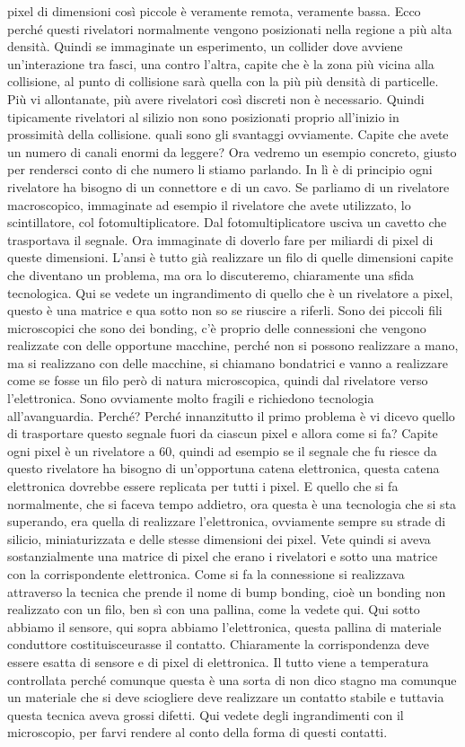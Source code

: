 pixel di dimensioni così piccole è veramente remota, veramente bassa. Ecco perché questi rivelatori normalmente vengono posizionati nella regione a più alta densità. Quindi se immaginate un esperimento, un collider dove avviene un'interazione tra fasci, una contro l'altra, capite che è la zona più vicina alla collisione, al punto di collisione sarà quella con la più più densità di particelle. Più vi allontanate, più avere rivelatori così discreti non è necessario. Quindi tipicamente rivelatori al silizio non sono posizionati proprio all'inizio in prossimità della collisione. quali sono gli svantaggi ovviamente. Capite che avete un numero di canali enormi da leggere? Ora vedremo un esempio concreto, giusto per rendersci conto di che numero li stiamo parlando. In lì è di principio ogni rivelatore ha bisogno di un connettore e di un cavo. Se parliamo di un rivelatore macroscopico, immaginate ad esempio il rivelatore che avete utilizzato, lo scintillatore, col fotomultiplicatore. Dal fotomultiplicatore usciva un cavetto che trasportava il segnale. Ora immaginate di doverlo fare per miliardi di pixel di queste dimensioni. L'ansi è tutto già realizzare un filo di quelle dimensioni capite che diventano un problema, ma ora lo discuteremo, chiaramente una sfida tecnologica. Qui se vedete un ingrandimento di quello che è un rivelatore a pixel, questo è una matrice e qua sotto non so se riuscire a riferli. Sono dei piccoli fili microscopici che sono dei bonding, c'è proprio delle connessioni che vengono realizzate con delle opportune macchine, perché non si possono realizzare a mano, ma si realizzano con delle macchine, si chiamano bondatrici e vanno a realizzare come se fosse un filo però di natura microscopica, quindi dal rivelatore verso l'elettronica. Sono ovviamente molto fragili e richiedono tecnologia all'avanguardia. Perché? Perché innanzitutto il primo problema è vi dicevo quello di trasportare questo segnale fuori da ciascun pixel e allora come si fa? Capite ogni pixel è un rivelatore a 60, quindi ad esempio se il segnale che fu riesce da questo rivelatore ha bisogno di un'opportuna catena elettronica, questa catena elettronica dovrebbe essere replicata per tutti i pixel. E quello che si fa normalmente, che si faceva tempo addietro, ora questa è una tecnologia che si sta superando, era quella di realizzare l'elettronica, ovviamente sempre su strade di silicio, miniaturizzata e delle stesse dimensioni dei pixel. Vete quindi si aveva sostanzialmente una matrice di pixel che erano i rivelatori e sotto una matrice con la corrispondente elettronica. Come si fa la connessione si realizzava attraverso la tecnica che prende il nome di bump bonding, cioè un bonding non realizzato con un filo, ben sì con una pallina, come la vedete qui. Qui sotto abbiamo il sensore, qui sopra abbiamo l'elettronica, questa pallina di materiale conduttore costituisceurasse il contatto. Chiaramente la corrispondenza deve essere esatta di sensore e di pixel di elettronica. Il tutto viene a temperatura controllata perché comunque questa è una sorta di non dico stagno ma comunque un materiale che si deve sciogliere deve realizzare un contatto stabile e tuttavia questa tecnica aveva grossi difetti. Qui vedete degli ingrandimenti con il microscopio, per farvi rendere al conto della forma di questi contatti. 